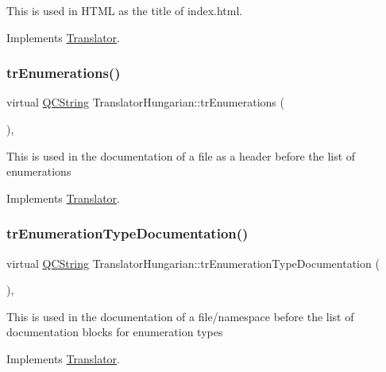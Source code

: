 This is used in H\+T\+ML as the title of index.\+html. 

Implements \mbox{\hyperlink{class_translator}{Translator}}.

\mbox{\label{class_translator_hungarian_a81dfadc983c1a5cfc8a075d55cf73408}} 
\subsubsection{\texorpdfstring{trEnumerations()}{trEnumerations()}}
{\footnotesize\ttfamily virtual \mbox{\hyperlink{class_q_c_string}{Q\+C\+String}} Translator\+Hungarian\+::tr\+Enumerations (\begin{DoxyParamCaption}{ }\end{DoxyParamCaption})\hspace{0.3cm}{\ttfamily [inline]}, {\ttfamily [virtual]}}

This is used in the documentation of a file as a header before the list of enumerations 

Implements \mbox{\hyperlink{class_translator}{Translator}}.

\mbox{\label{class_translator_hungarian_a6af0dbd5f68bf1a730e3283a928d421d}} 
\subsubsection{\texorpdfstring{trEnumerationTypeDocumentation()}{trEnumerationTypeDocumentation()}}
{\footnotesize\ttfamily virtual \mbox{\hyperlink{class_q_c_string}{Q\+C\+String}} Translator\+Hungarian\+::tr\+Enumeration\+Type\+Documentation (\begin{DoxyParamCaption}{ }\end{DoxyParamCaption})\hspace{0.3cm}{\ttfamily [inline]}, {\ttfamily [virtual]}}

This is used in the documentation of a file/namespace before the list of documentation blocks for enumeration types 

Implements \mbox{\hyperlink{class_translator}{Translator}}.

